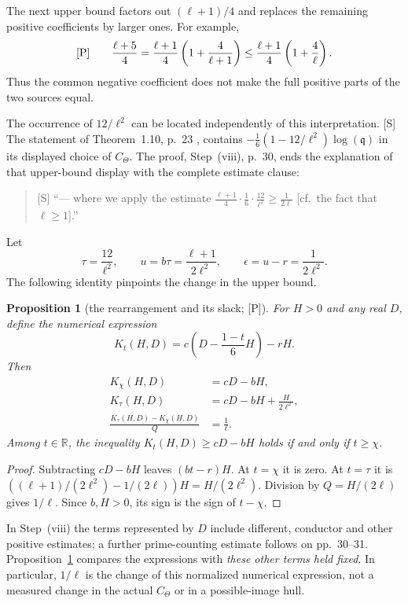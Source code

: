 \documentclass[11pt]{article}
\newtheorem{proposition}{Proposition}
\theoremstyle{remark}
\newcommand{\Smark}{\textup{[S]}}
\newcommand{\Pmark}{\textup{[P]}}
\begin{document}
The next upper bound factors out $(\ell+1)/4$ and replaces the remaining
positive coefficients by larger ones.  For example,
\[
 \Pmark\qquad \frac{\ell+5}{4}
 =\frac{\ell+1}{4}\left(1+\frac4{\ell+1}\right)
 \le\frac{\ell+1}{4}\left(1+\frac4\ell\right).
\]
Thus the common negative coefficient does not make the full positive
parts of the two sources equal.

The occurrence of $12/\ell^2$ can be located independently of this
interpretation.  \Smark{} The statement of Theorem~1.10, p.~23
\cite[Thm.~1.10, p.~23; proof, Step~(viii), p.~30]{IUT4}, contains
$-\frac16(1-12/\ell^2)\log(\mathfrak q)$ in its displayed choice of $C_\Theta$.
The proof, Step~(viii), p.~30, ends the explanation of that upper-bound
display with the complete estimate clause:
\begin{quote}
\Smark{} ``--- where we apply the estimate
$\frac{\ell+1}{4}\cdot\frac16\cdot\frac{12}{\ell^2}\ge\frac1{2\ell}$
[cf.\ the fact that $\ell\ge1$].''
\end{quote}
Let
\[
 \tau=\frac{12}{\ell^2},\qquad
 u=b\tau=\frac{\ell+1}{2\ell^2},\qquad
 \epsilon=u-r=\frac1{2\ell^2}.
\]
The following identity pinpoints the change in the upper bound.

\begin{proposition}[the rearrangement and its slack; \Pmark]\label{p:slack}
For $H>0$ and any real $D$, define the numerical expression
\[
 K_t(H,D)=c\left(D-\frac{1-t}{6}H\right)-rH.
\]
Then
\begin{align*}
 K_\chi(H,D)&=cD-bH,\\
 K_\tau(H,D)&=cD-bH+\frac{H}{2\ell^2},\\
 \frac{K_\tau(H,D)-K_\chi(H,D)}{Q}&=\frac1\ell.
\end{align*}
Among $t\in\mathbb R$, the inequality
$K_t(H,D)\ge cD-bH$ holds if and only if $t\ge\chi$.
\end{proposition}
\begin{proof}
Subtracting $cD-bH$ leaves $(bt-r)H$.
At $t=\chi$ it is zero.  At $t=\tau$ it is
$((\ell+1)/(2\ell^2)-1/(2\ell))H=H/(2\ell^2)$.
Division by $Q=H/(2\ell)$ gives $1/\ell$.
Since $b,H>0$, its sign is the sign of $t-\chi$.
\end{proof}

In Step~(viii) the terms represented by $D$ include different, conductor
and other positive estimates; a further prime-counting estimate follows
on pp.~30--31.  Proposition~\ref{p:slack} compares the expressions with
\emph{these other terms held fixed}.  In particular, $1/\ell$ is the
change of this normalized numerical expression, not a measured change
in the actual $C_\Theta$ or in a possible-image hull.
\end{document}
